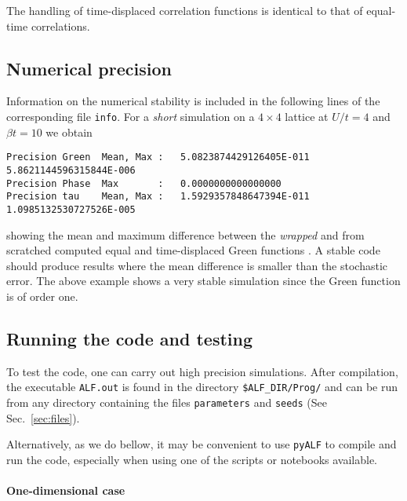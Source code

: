 The handling of time-displaced correlation functions is identical to that of equal-time correlations. 

\subsection{Numerical precision}\label{sec:prec_spin}

Information on the numerical stability is included in the following lines of the corresponding file \texttt{info}. 
For a  \textit{short} simulation on a $4 \times 4$  lattice at $U/t=4$ and $\beta t = 10$  we obtain
\begin{lstlisting}[basicstyle=\ttfamily\small,columns=fullflexible,keepspaces=true]
Precision Green  Mean, Max :   5.0823874429126405E-011  5.8621144596315844E-006
Precision Phase  Max       :   0.0000000000000000    
Precision tau    Mean, Max :   1.5929357848647394E-011  1.0985132530727526E-005 
\end{lstlisting}
showing the mean and maximum difference between the \textit{wrapped}  and from scratched computed equal and time-displaced  Green functions \cite{Assaad08_rev}.
A stable code  should produce results where the mean difference is smaller than the  stochastic error. The above example  shows a very stable simulation since the Green function  is of order one. 

\subsection{Running the code and testing}

To test the code, one can carry out high precision simulations. After compilation, the executable \texttt{ALF.out} is found in the directory \texttt{\$ALF\_DIR/Prog/} and can be run from any directory containing the files \texttt{parameters} and \texttt{seeds} (See Sec.~\ref{sec:files}).

Alternatively, as we do bellow, it may be convenient to use \texttt{pyALF} to compile and run the code, especially when using one of the scripts or notebooks available.  

\paragraph*{One-dimensional case} 

